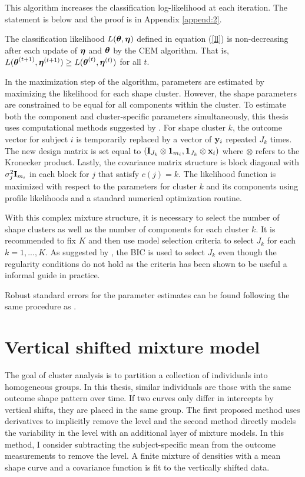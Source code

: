 This algorithm increases the classification log-likelihood at each iteration. The statement is below and the proof is in Appendix \ref{append:2}. 
\begin{theorem}\label{Thm:CEM} The classification likelihood $L(\boldsymbol\theta,\boldsymbol\eta)$ defined in equation (\ref{ll}) is non-decreasing after each update of $\boldsymbol\eta$ and $\boldsymbol\theta$ by the CEM algorithm. That is, $L(\boldsymbol\theta^{(t+1)},\boldsymbol\eta^{(t+1)}) \geq L(\boldsymbol\theta^{(t)},\boldsymbol\eta^{(t)})$ for all $t$.
\end{theorem}

In the maximization step of the algorithm, parameters are estimated by maximizing the likelihood for each shape cluster. However, the shape parameters are constrained to be equal for all components within the cluster. To estimate both the component and cluster-specific parameters simultaneously, this thesis uses computational methods suggested by \textcite{grun2008}. For shape cluster $k$, the outcome vector for subject $i$ is temporarily replaced by a vector of $\mathbf y_{i}$ repeated $J_{k}$ times. The new design matrix  is set equal to $(\mathbf I_{J_{k}}\otimes \boldsymbol 1_{m_{i}}, \boldsymbol 1_{J_{k}} \otimes \mathbf x_{i})$ where $\otimes$ refers to the Kronecker product. Lastly, the covariance matrix structure is block diagonal with $\sigma^{2}_{j}\mathbf I_{m_{i}}$ in each block for $j$ that satisfy $c(j)=k$. The likelihood function is maximized with respect to the parameters for cluster $k$ and its components using profile likelihoods and a standard numerical optimization routine.

With this complex mixture structure, it is necessary to select the number of shape clusters as well as the number of components for each cluster $k$. It is recommended to fix $K$ and then use model selection criteria to select $J_{k}$ for each $k=1,...,K$. As suggested by \textcite{li2005}, the BIC is used to select $J_{k}$ even though the regularity conditions do not hold as the criteria has been shown to be useful a informal guide in practice.

Robust standard errors for the parameter estimates can be found following the same procedure as \textcite{boldea2009}.

\section{Vertical shifted mixture model}
The goal of cluster analysis is to partition a collection of individuals into homogeneous groups. In this thesis, similar individuals are those with the same outcome shape pattern over time. If two curves only differ in intercepts by vertical shifts, they are placed in the same group. The first proposed method uses derivatives to implicitly remove the level and the second method directly models the variability in the level with an additional layer of mixture models.  In this method, I consider subtracting the subject-specific mean from the outcome measurements to remove the level. A finite mixture of densities with a mean shape curve and a covariance function is fit to the vertically shifted data. 

